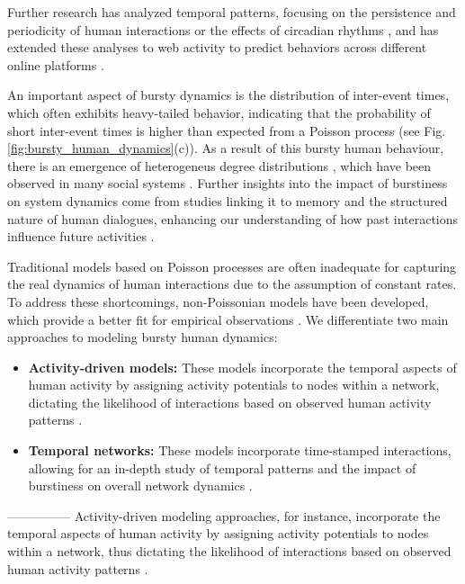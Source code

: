 Further research has analyzed temporal patterns, focusing on the persistence and periodicity of human interactions \cite{Clauset2007Proximity} or the effects of circadian rhythms \cite{Jo2012Circadian}, and has extended these analyses to web activity to predict behaviors across different online platforms \cite{Radicchi2009WebActivity}.

An important aspect of bursty dynamics is the distribution of inter-event times, which often exhibits heavy-tailed behavior, indicating that the probability of short inter-event times is higher than expected from a Poisson process (see Fig. \ref{fig:bursty_human_dynamics}(c)). As a result of this bursty human behaviour, there is an emergence of heterogeneus degree distributions \cite{Muchnik2013PowerLaw}, which have been observed in many social systems \cite{barabasi2009scale}. Further insights into the impact of burstiness on system dynamics come from studies linking it to memory and the structured nature of human dialogues, enhancing our understanding of how past interactions influence future activities \cite{karsai2012universal, Goh2008Burstiness, Eckmann2004Entropy}.

Traditional models based on Poisson processes are often inadequate for capturing the real dynamics of human interactions due to the assumption of constant rates. To address these shortcomings, non-Poissonian models have been developed, which provide a better fit for empirical observations \cite{Vazquez2006Bursts}. We differentiate two main approaches to modeling bursty human dynamics:

\begin{itemize}
    \item \textbf{Activity-driven models:} These models incorporate the temporal aspects of human activity by assigning activity potentials to nodes within a network, dictating the likelihood of interactions based on observed human activity patterns \cite{Perra2012ActivityDriven}.
    \item \textbf{Temporal networks:} These models incorporate time-stamped interactions, allowing for an in-depth study of temporal patterns and the impact of burstiness on overall network dynamics \cite{Holme2012Temporal}.
\end{itemize}
---------------
Activity-driven modeling approaches, for instance, incorporate the temporal aspects of human activity by assigning activity potentials to nodes within a network, thus dictating the likelihood of interactions based on observed human activity patterns \cite{Perra2012ActivityDriven}.

